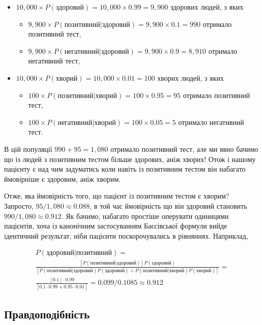 \documentclass[
  11pt,
]{book}
\begin{document}
\begin{itemize}
\item
  \(10,000 \times P(\text{здоровий}) = 10,000 \times 0.99 = 9,900\)
  здорових людей, з яких

  \begin{itemize}
  \item
    \(9,900 \times P(\text{позитивний|здоровий}) = 9,900 \times 0.1 = 990\)
    отримало позитивний тест,
  \item
    \(9,900 \times P(\text{негативний|здоровий}) = 9,900 \times 0.9 = 8,910\)
    отримало негативний тест,
  \end{itemize}
\item
  \(10,000 \times P(\text{хворий}) = 10,000 \times 0.01 = 100\) хворих
  людей, з яких

  \begin{itemize}
  \item
    \(100 \times P(\text{позитивний|хворий}) = 100 \times 0.95 = 95\)
    отримало позитивний тест,
  \item
    \(100 \times P(\text{негативний|хворий}) = 100 \times 0.05 = 5\)
    отримало негативний тест.
  \end{itemize}
\end{itemize}

В цій популяції \(990 + 95 = 1,080\) отримало позитивний тест, але ми
явно бачимо що із людей з позитивним тестом більше здорових, аніж
хворих! Отож і нашому пацієнту є над чим задуматись коли навіть із
позитивним тестом він набагато ймовірніше є здоровим, аніж хворим.

Отже, яка ймовірність того, що пацієнт із позитивним тестом є хворим?
Запросто, \(95/1,080 \approx 0.088\), в той час ймовірність що він
здоровий становить \(990/1,080 \approx 0.912\). Як бачимо, набагато
простіше оперувати одиницями пацієнтів, хоча із канонічним застосуванням
Баєсівської формули вийде ідентичний результат, ніби пацієнти
поскорочувались в рівняннях. Наприклад,

\[
\begin{aligned}
  P(\text{здоровий|позитивний}) = \\ 
  \frac{[P(позитивний|здоровий)] P(здоровий)}{[P(позитивний|здоровий) P(здоровий) + P(позитивний|хворий) P(хворий)]} = \\
  \frac{[0.1] \cdot 0.99}{[0.1 \cdot 0.99 + 0.95 \cdot 0.01]} = 0.099/0.1085 \approx 0.912
\end{aligned}
\]

\subsection{Правдоподібність}\label{mle}
\end{document}
